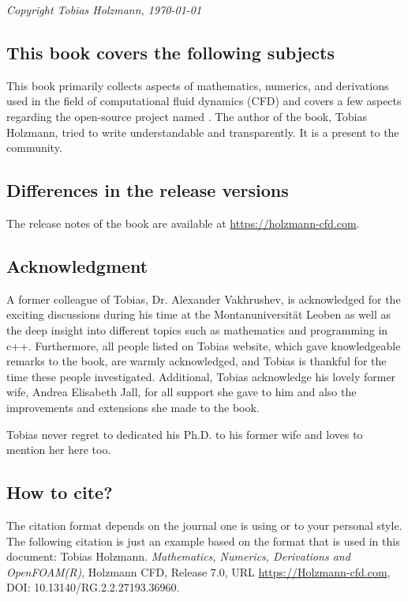 %
%
\textit{Copyright Tobias Holzmann, \today}
%
%
\vspace{1cm}



\subsection*{This book covers the following subjects}
%
%
%
%
    This book primarily collects aspects of mathematics, numerics, and
    derivations used in the field of computational fluid dynamics (CFD) and
    covers a few aspects regarding the open-source project named \OF.
    The author of the book, Tobias Holzmann, tried to write understandable and
    transparently. It is a present to the \OF community.
%
%
%
%
%
\subsection*{Differences in the release versions}
%
%
	The release notes of the book are available at \url{https://holzmann-cfd.com}.
%
%
%
%
\subsection*{Acknowledgment}
%
%
%
%
    A former colleague of Tobias, Dr. Alexander Vakhrushev, is acknowledged for
    the exciting discussions during his time at the Montanuniversität Leoben
    as well as the deep insight into different topics such as mathematics and
    programming in c++. Furthermore, all people listed on Tobias website, which
    gave knowledgeable remarks to the book, are warmly acknowledged, and Tobias
    is thankful for the time these people investigated. Additional, Tobias
    acknowledge his lovely former wife, Andrea Elisabeth Jall, for all support
    she gave to him and also the improvements and extensions she made to the book.

    Tobias never regret to dedicated his Ph.D. to his former wife and loves to
    mention her here too.
%
%
%

\subsection*{How to cite?}
%
%
    The citation format depends on the journal one is using or to your personal
    style. The following citation is just an example based on the format that
    is used in this document:
    \vspace{0.5cm}
%
%
\newline
%
%
%
    Tobias Holzmann. \textit{Mathematics, Numerics, Derivations and OpenFOAM(R)},
    Holzmann CFD, Release 7.0, URL \url{https://Holzmann-cfd.com},
    DOI: 10.13140/RG.2.2.27193.36960.

